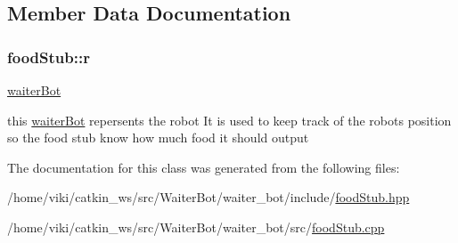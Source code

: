 \subsection{Member Data Documentation}
\subsubsection[{\texorpdfstring{r}{r}}]{ food\+Stub\+::r}\hypertarget{classfoodStub_a88a32b2f907a471c65631dfffb24c787}{}\label{classfoodStub_a88a32b2f907a471c65631dfffb24c787}


\hyperlink{classwaiterBot}{waiter\+Bot} 

this \hyperlink{classwaiterBot}{waiter\+Bot} repersents the robot It is used to keep track of the robots position so the food stub know how much food it should output 

The documentation for this class was generated from the following files\+:\begin{DoxyCompactItemize}
\item 
/home/viki/catkin\+\_\+ws/src/\+Waiter\+Bot/waiter\+\_\+bot/include/\hyperlink{foodStub_8hpp}{food\+Stub.\+hpp}\item 
/home/viki/catkin\+\_\+ws/src/\+Waiter\+Bot/waiter\+\_\+bot/src/\hyperlink{foodStub_8cpp}{food\+Stub.\+cpp}\end{DoxyCompactItemize}
